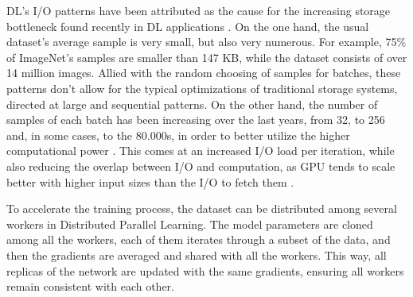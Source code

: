 \documentclass[conference]{IEEEtran}
\begin{document}
    DL's I/O patterns have been attributed as the cause for the increasing storage bottleneck found recently in DL applications \cite{beegfs}. On the one hand, the usual dataset's average sample is very small, but also very numerous. For example, 75\% of ImageNet's samples are smaller than 147 KB, while the dataset consists of over 14 million images. Allied with the random choosing of samples for batches, these patterns don't allow for the typical optimizations of traditional storage systems, directed at large and sequential patterns. On the other hand, the number of samples of each batch has been increasing over the last years, from 32, to 256 and, in some cases, to the 80.000s, in order to better utilize the higher computational power \cite{nvme}. This comes at an increased I/O load per iteration, while also reducing the overlap between I/O and computation, as GPU tends to scale better with higher input sizes than the I/O to fetch them \cite{TFbenchmark}.
    

    To accelerate the training process, the dataset can be distributed among several workers in Distributed Parallel Learning. The model parameters are cloned among all the workers, each of them iterates through a subset of the data, and then the gradients are averaged and shared with all the workers. This way, all replicas of the network are updated with the same gradients, ensuring all workers remain consistent with each other.
\end{document}
